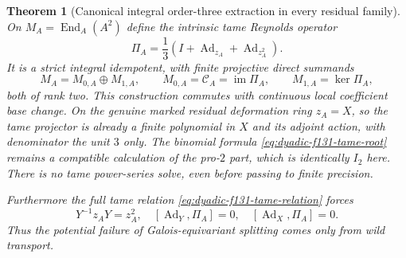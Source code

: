 \documentclass[11pt]{article}
\newtheorem{theorem}{Theorem}[section]
\theoremstyle{definition}
\begin{document}
\begin{theorem}[Canonical integral order-three extraction in every residual family]
On $M_A=\operatorname{End}_A(A^2)$
define the intrinsic tame Reynolds operator
\begin{equation}\label{eq:dyadic-f131-universal-tame-projector}
\boxed{\qquad
\Pi_A=\frac13
\left(I+\operatorname{Ad}_{z_A}
+\operatorname{Ad}_{z_A^2}\right).
\qquad}
\end{equation}
It is a strict integral idempotent,
with finite projective direct summands
\begin{equation}\label{eq:dyadic-f131-universal-tame-summands}
M_A=M_{0,A}\oplus M_{1,A},
\qquad M_{0,A}=\mathcal C_A=\operatorname{im}\Pi_A,
\qquad M_{1,A}=\ker\Pi_A,
\end{equation}
both of rank two.
This construction commutes with
continuous local coefficient base
change.  On the genuine
marked residual deformation ring
$z_A=X$, so the tame
projector is already a
\emph{finite polynomial} in
$X$ and its adjoint action,
with denominator the unit $3$
only.  The binomial formula
\eqref{eq:dyadic-f131-tame-root}
remains a compatible calculation
of the pro-$2$ part, which is
identically $I_2$ here.
There is no tame power-series
solve, even before passing
to finite precision.

Furthermore the full tame relation
\eqref{eq:dyadic-f131-tame-relation}
forces
\begin{equation}\label{eq:dyadic-f131-sigma-tame-normalization}
\boxed{\qquad
Y^{-1}z_A Y=z_A^2,
\quad
[\operatorname{Ad}_Y,\Pi_A]=0,
\quad
[\operatorname{Ad}_X,\Pi_A]=0.
\qquad}
\end{equation}
Thus the potential failure of
Galois-equivariant splitting comes
\emph{only} from wild transport.
\end{theorem}
\end{document}
